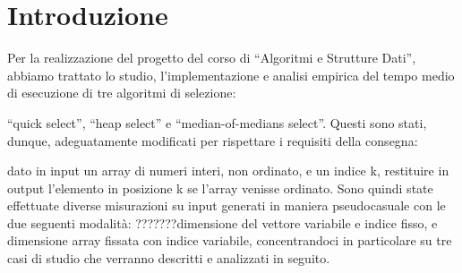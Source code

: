 \section{Introduzione}
Per la realizzazione del progetto del corso di “Algoritmi e Strutture Dati”, 
abbiamo trattato lo studio, l'implementazione e 
analisi empirica del tempo medio di esecuzione di tre algoritmi di selezione: 

“quick select”, “heap select” e “median-of-medians select”. 
Questi sono stati, dunque, adeguatamente modificati per rispettare i requisiti della consegna:

dato in input un array di numeri interi, non ordinato, e un indice k, restituire in output l'elemento in posizione k se l'array venisse ordinato.
Sono quindi state effettuate diverse misurazioni su input generati in maniera pseudocasuale con le due seguenti modalità:
???????dimensione del vettore variabile e indice fisso, e dimensione array fissata con indice variabile, concentrandoci in particolare su tre casi di studio che verranno descritti e analizzati in seguito.




